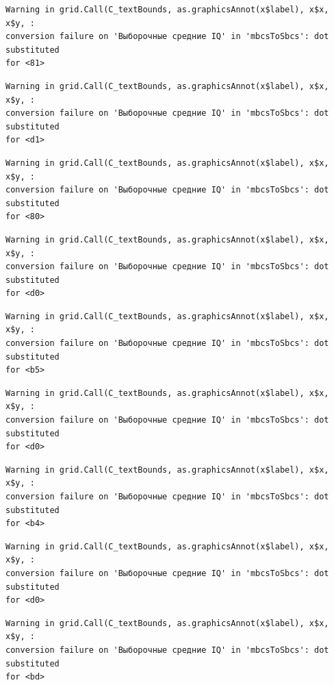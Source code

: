 \documentclass[
  letterpaper,
  DIV=11,
  numbers=noendperiod]{scrreprt}
\theoremstyle{definition}
\theoremstyle{remark}
\begin{document}
\begin{verbatim}
Warning in grid.Call(C_textBounds, as.graphicsAnnot(x$label), x$x, x$y, :
conversion failure on 'Выборочные средние IQ' in 'mbcsToSbcs': dot substituted
for <81>
\end{verbatim}

\begin{verbatim}
Warning in grid.Call(C_textBounds, as.graphicsAnnot(x$label), x$x, x$y, :
conversion failure on 'Выборочные средние IQ' in 'mbcsToSbcs': dot substituted
for <d1>
\end{verbatim}

\begin{verbatim}
Warning in grid.Call(C_textBounds, as.graphicsAnnot(x$label), x$x, x$y, :
conversion failure on 'Выборочные средние IQ' in 'mbcsToSbcs': dot substituted
for <80>
\end{verbatim}

\begin{verbatim}
Warning in grid.Call(C_textBounds, as.graphicsAnnot(x$label), x$x, x$y, :
conversion failure on 'Выборочные средние IQ' in 'mbcsToSbcs': dot substituted
for <d0>
\end{verbatim}

\begin{verbatim}
Warning in grid.Call(C_textBounds, as.graphicsAnnot(x$label), x$x, x$y, :
conversion failure on 'Выборочные средние IQ' in 'mbcsToSbcs': dot substituted
for <b5>
\end{verbatim}

\begin{verbatim}
Warning in grid.Call(C_textBounds, as.graphicsAnnot(x$label), x$x, x$y, :
conversion failure on 'Выборочные средние IQ' in 'mbcsToSbcs': dot substituted
for <d0>
\end{verbatim}

\begin{verbatim}
Warning in grid.Call(C_textBounds, as.graphicsAnnot(x$label), x$x, x$y, :
conversion failure on 'Выборочные средние IQ' in 'mbcsToSbcs': dot substituted
for <b4>
\end{verbatim}

\begin{verbatim}
Warning in grid.Call(C_textBounds, as.graphicsAnnot(x$label), x$x, x$y, :
conversion failure on 'Выборочные средние IQ' in 'mbcsToSbcs': dot substituted
for <d0>
\end{verbatim}

\begin{verbatim}
Warning in grid.Call(C_textBounds, as.graphicsAnnot(x$label), x$x, x$y, :
conversion failure on 'Выборочные средние IQ' in 'mbcsToSbcs': dot substituted
for <bd>
\end{verbatim}
\end{document}
